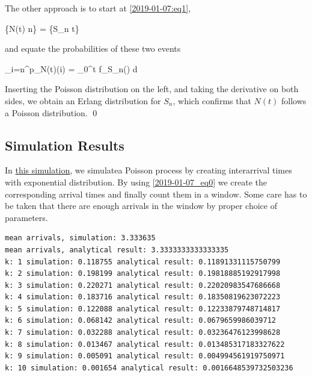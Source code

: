 The other approach is to start at \eqref{2019-01-07:eq1},

\bee
\{N(t) \geq n\} = \{S_n \leq t\}
\eee

and equate the probabilities of these two events

\bee
\sum_{i=n}^\infty p_{N(t)}(i) = \int_0^t f_{S_n}(\tau) d\tau
\eee

Inserting the Poisson distribution on the left, and taking the derivative on both sides, we obtain an Erlang distribution for $S_n$, which confirms that $N(t)$ follows a Poisson distribution. \qed

\subsection{Simulation Results}

In \href{}{this simulation}, we simulatea Poisson process by creating interarrival times with exponential distribution. By using \eqref{2019-01-07_eq0} we create the corresponding arrival times and finally count them in a window. Some care has to be taken that there are enough arrivals in the window by proper choice of parameters.


\begin{verbatim}
mean arrivals, simulation: 3.333635
mean arrivals, analytical result: 3.3333333333333335
k: 1 simulation: 0.118755 analytical result: 0.11891331115750799
k: 2 simulation: 0.198199 analytical result: 0.19818885192917998
k: 3 simulation: 0.220271 analytical result: 0.22020983547686668
k: 4 simulation: 0.183716 analytical result: 0.18350819623072223
k: 5 simulation: 0.122088 analytical result: 0.12233879748714817
k: 6 simulation: 0.068142 analytical result: 0.0679659986039712
k: 7 simulation: 0.032288 analytical result: 0.03236476123998628
k: 8 simulation: 0.013467 analytical result: 0.013485317183327622
k: 9 simulation: 0.005091 analytical result: 0.004994561919750971
k: 10 simulation: 0.001654 analytical result: 0.0016648539732503236
\end{verbatim}


